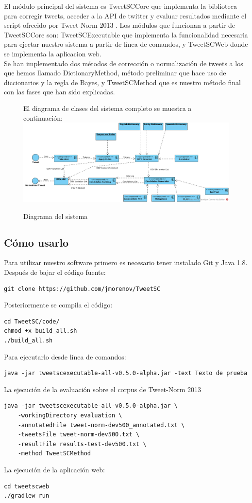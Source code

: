 \documentclass[spanish,12pt, a4paper,twoside]{paper}
\begin{document}
El módulo principal del sistema es TweetSCCore que implementa la biblioteca para corregir tweets, acceder a la API de twitter y evaluar resultados mediante el script ofrecido por Tweet-Norm 2013 \cite{alegria:2013}. Los módulos que funcionan a partir de TweetSCCore son: TweetSCExecutable que implementa la funcionalidad necesaria para ejectar nuestro sistema a partir de línea de comandos, y TweetSCWeb donde se implementa la aplicacion web.\\

Se han implementado dos métodos de corrección o normalización de tweets a los que hemos llamado DictionaryMethod, método preliminar que hace uso de diccionarios y la regla de Bayes, y TweetSCMethod que es nuestro método final con las fases que han sido explicadas.

\begin{figure}[h]
El diagrama de clases del sistema completo se muestra a continuación:
 \includegraphics[width=1.2\textwidth]{recursos/DiagramaDelSistema.png}
\caption{Diagrama del sistema}
\label{fig:diagramadelsistema}
\end{figure}

\newpage
\subsection{Cómo usarlo}\label{sec:comousarlo}
Para utilizar nuestro software primero es necesario tener instalado Git y Java 1.8. Después de bajar el código fuente: 
\begin{verbatim}
git clone https://github.com/jmorenov/TweetSC
\end{verbatim}
Posteriormente se compila el código: 
\begin{verbatim}
cd TweetSC/code/
chmod +x build_all.sh
./build_all.sh
\end{verbatim}
Para ejecutarlo desde línea de comandos:
\begin{verbatim}
java -jar tweetscexecutable-all-v0.5.0-alpha.jar -text Texto de prueba
\end{verbatim}
La ejecución de la evaluación sobre el corpus de Tweet-Norm 2013 \cite{alegria:2013}
\begin{verbatim}
java -jar tweetscexecutable-all-v0.5.0-alpha.jar \
    -workingDirectory evaluation \
    -annotatedFile tweet-norm-dev500_annotated.txt \
    -tweetsFile tweet-norm-dev500.txt \
    -resultFile results-test-dev500.txt \
    -method TweetSCMethod
\end{verbatim}
La ejecución de la aplicación web:
\begin{verbatim}
cd tweetscweb
./gradlew run
\end{verbatim}
\end{document}
